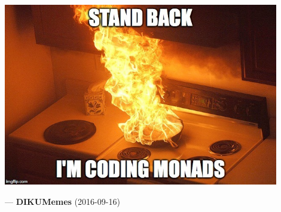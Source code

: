 \begin{frame}

\vspace{\fill}

\begin{center}

\includegraphics[width=0.9\textwidth]{memes/standback}

\end{center}

\begin{flushright}

--- \textbf{DIKUMemes} (2016-09-16)

\end{flushright}

\vspace{\fill}

\end{frame}
